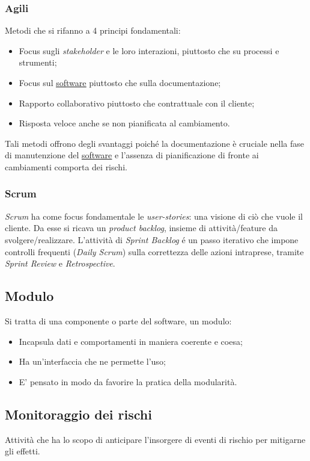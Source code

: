 		\subsubsection{Agili}
		Metodi che si rifanno a 4 principi fondamentali:
			\begin{itemize}
			\item Focus sugli \emph{stakeholder} e le loro interazioni, piuttosto che su processi e strumenti;
			\item Focus sul \underline{\hyperref[sec:prodottosoftware]{software}} piuttosto che sulla documentazione;
			\item Rapporto collaborativo piuttosto che contrattuale con il cliente;
			\item Risposta veloce anche se non pianificata al cambiamento.
			\end{itemize}
		Tali metodi offrono degli svantaggi poiché la documentazione è cruciale nella fase di manutenzione del \underline{\hyperref[sec:prodottosoftware]{software}} e l'assenza di pianificazione di fronte ai cambiamenti comporta dei rischi.


			\subsubsection{Scrum}
				\emph{Scrum} ha come focus fondamentale le  \emph{user-stories}: una visione di ciò che vuole il cliente. Da esse si ricava un \emph{product backlog}, insieme di attività/feature da svolgere/realizzare. L'attività di \emph{Sprint Backlog} é un passo iterativo che impone controlli frequenti (\emph{Daily Scrum}) sulla correttezza delle azioni intraprese, tramite \emph{Sprint Review} e \emph{Retrospective}.


	\subsection{Modulo}
	\label{sec:modulo}
	Si tratta di una componente o parte del software, un modulo:
	\begin{itemize}
	\item Incapsula dati e comportamenti in maniera coerente e coesa;
	\item Ha un'interfaccia che ne permette l'uso;
	\item E' pensato in modo da favorire la pratica della modularità.
	\end{itemize}


	\subsection{Monitoraggio dei rischi}
	\label{sec:monitoraggiorischi}
	Attività che ha lo scopo di anticipare l'insorgere di eventi di rischio per mitigarne gli effetti.


